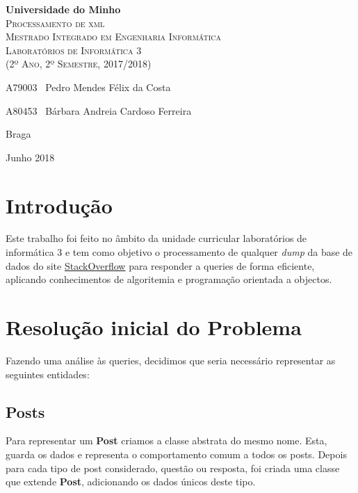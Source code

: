 \documentclass[10pt,a4paper]{report}
\begin{document}
\begin{titlepage}
    \center
    {\huge {\bf Universidade do Minho}}\\[0.4cm]
    \vspace{3.0cm}
    \textsc{\huge{Processamento de xml}}\\[0.5cm]
    \vspace{3.0cm}
    \textsc{\huge{Mestrado Integrado em Engenharia Informática}}\\[0.5cm]
    \vspace{2.0cm}
    \textsc{Laboratórios de Informática 3}\\[0.5cm]
    \textsc{(2º Ano, 2º Semestre, 2017/2018)}\\[0.5cm]
    \vspace{1.5cm}
    \begin{flushleft}
        A79003 \,\,\,Pedro Mendes Félix da Costa
        \vspace{0.2cm}

        A80453 \,\,\,Bárbara Andreia Cardoso Ferreira
    \end{flushleft}
        \vspace{1cm}
    \begin{flushright}
        Braga

        Junho 2018
    \end{flushright}

\end{titlepage}

\tableofcontents
\clearpage

\chapter{Introdução}
    Este trabalho foi feito no âmbito da unidade curricular laboratórios de
    informática 3 e tem como objetivo o processamento de qualquer \textit{dump}
    da base de dados do site \href{www.stackoverflow.com}{StackOverflow} para
    responder a queries de forma eficiente, aplicando conhecimentos de
    algoritemia e programação orientada a objectos.

\chapter{Resolução inicial do Problema}
    Fazendo uma análise às queries, decidimos que seria necessário representar
    as seguintes entidades:

    \section{Posts}
        Para representar um \textbf{Post} criamos a classe abstrata
        do mesmo nome. Esta, guarda os dados e representa o comportamento comum a
        todos os posts. Depois para cada tipo de post considerado, questão ou
        resposta, foi criada uma classe que extende \textbf{Post}, adicionando
        os dados únicos deste tipo.
\end{document}
